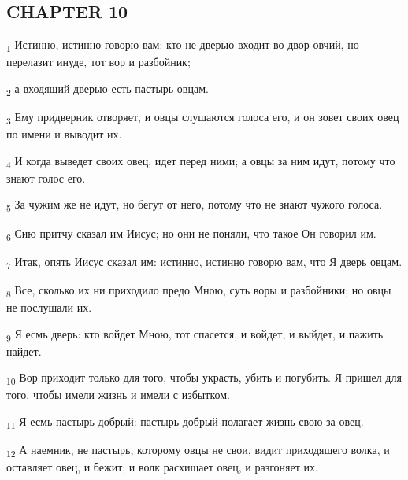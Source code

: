 \subsection{CHAPTER 10}
\begin{tcolorbox}
\textsubscript{1} Истинно, истинно говорю вам: кто не дверью входит во двор овчий, но перелазит инуде, тот вор и разбойник;
\end{tcolorbox}
\begin{tcolorbox}
\textsubscript{2} а входящий дверью есть пастырь овцам.
\end{tcolorbox}
\begin{tcolorbox}
\textsubscript{3} Ему придверник отворяет, и овцы слушаются голоса его, и он зовет своих овец по имени и выводит их.
\end{tcolorbox}
\begin{tcolorbox}
\textsubscript{4} И когда выведет своих овец, идет перед ними; а овцы за ним идут, потому что знают голос его.
\end{tcolorbox}
\begin{tcolorbox}
\textsubscript{5} За чужим же не идут, но бегут от него, потому что не знают чужого голоса.
\end{tcolorbox}
\begin{tcolorbox}
\textsubscript{6} Сию притчу сказал им Иисус; но они не поняли, что такое Он говорил им.
\end{tcolorbox}
\begin{tcolorbox}
\textsubscript{7} Итак, опять Иисус сказал им: истинно, истинно говорю вам, что Я дверь овцам.
\end{tcolorbox}
\begin{tcolorbox}
\textsubscript{8} Все, сколько их ни приходило предо Мною, суть воры и разбойники; но овцы не послушали их.
\end{tcolorbox}
\begin{tcolorbox}
\textsubscript{9} Я есмь дверь: кто войдет Мною, тот спасется, и войдет, и выйдет, и пажить найдет.
\end{tcolorbox}
\begin{tcolorbox}
\textsubscript{10} Вор приходит только для того, чтобы украсть, убить и погубить. Я пришел для того, чтобы имели жизнь и имели с избытком.
\end{tcolorbox}
\begin{tcolorbox}
\textsubscript{11} Я есмь пастырь добрый: пастырь добрый полагает жизнь свою за овец.
\end{tcolorbox}
\begin{tcolorbox}
\textsubscript{12} А наемник, не пастырь, которому овцы не свои, видит приходящего волка, и оставляет овец, и бежит; и волк расхищает овец, и разгоняет их.
\end{tcolorbox}

